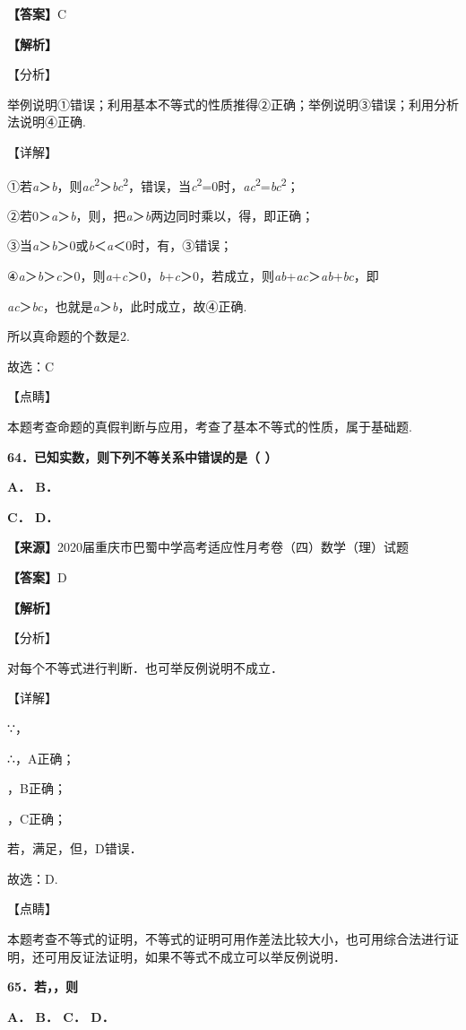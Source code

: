 \documentclass[
]{article}
\begin{document}
\textbf{【答案】}C

\textbf{【解析】}

【分析】

举例说明①错误；利用基本不等式的性质推得②正确；举例说明③错误；利用分析法说明④正确.

【详解】

①若\emph{a}＞\emph{b}，则\emph{ac}\textsuperscript{2}＞\emph{bc}\textsuperscript{2}，错误，当\emph{c}\textsuperscript{2}=0时，\emph{ac}\textsuperscript{2}=\emph{bc}\textsuperscript{2}；

②若0＞\emph{a}＞\emph{b}，则，把\emph{a}＞\emph{b}两边同时乘以，得，即正确；

③当\emph{a}＞\emph{b}＞0或\emph{b}＜\emph{a}＜0时，有，③错误；

④\emph{a}＞\emph{b}＞\emph{c}＞0，则\emph{a}+\emph{c}＞0，\emph{b}+\emph{c}＞0，若成立，则\emph{ab}+\emph{ac}＞\emph{ab}+\emph{bc}，即

\emph{ac}＞\emph{bc}，也就是\emph{a}＞\emph{b}，此时成立，故④正确.

所以真命题的个数是2.

故选：C

【点睛】

本题考查命题的真假判断与应用，考查了基本不等式的性质，属于基础题.

\textbf{64．已知实数，则下列不等关系中错误的是（ ）}

\textbf{A． B．}

\textbf{C． D．}

\textbf{【来源】}2020届重庆市巴蜀中学高考适应性月考卷（四）数学（理）试题

\textbf{【答案】}D

\textbf{【解析】}

【分析】

对每个不等式进行判断．也可举反例说明不成立．

【详解】

∵，

∴，A正确；

，B正确；

，C正确；

若，满足，但，D错误．

故选：D.

【点睛】

本题考查不等式的证明，不等式的证明可用作差法比较大小，也可用综合法进行证明，还可用反证法证明，如果不等式不成立可以举反例说明．

\textbf{65．若，，则　　}

\textbf{A． B． C． D．}
\end{document}
